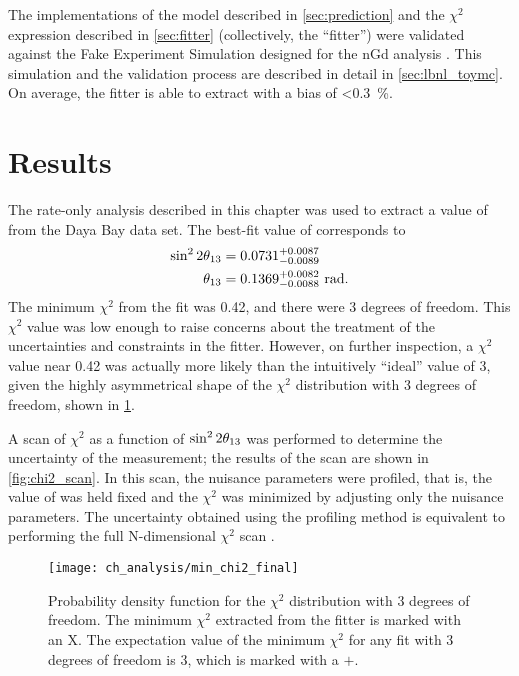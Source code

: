 The implementations of the model described in \cref{sec:prediction}
and the $\chi^2$ expression described in \cref{sec:fitter}
(collectively, the ``fitter'')
were validated against the Fake Experiment Simulation
designed for the nGd analysis \cite{lbnl_toymc}.
This simulation and the validation process are described in detail in \cref{sec:lbnl_toymc}.
On average, the fitter is able to extract \thetaot{}
with a bias of \SI{<0.3}{\percent}.

\section{Results}
\label{sec:results}

The rate-only analysis described in this chapter
was used to extract a value of \thetaot{}
from the Daya Bay data set.
The best-fit value of \thetaot{} corresponds to
\begin{align}\label{eq:result}
    \begin{split}
        \sin^22\theta_{13} &= 0.0731^{+0.0087}_{-0.0089}\\
        \theta_{13} &= 0.1369^{+0.0082}_{-0.0088}\ \si{\radian}.
    \end{split}
\end{align}
The minimum $\chi^2$ from the fit was 0.42, and there were 3 degrees of freedom.
This $\chi^2$ value was low enough to raise concerns
about the treatment of the uncertainties and constraints in the fitter.
However, on further inspection, a $\chi^2$ value near 0.42
was actually more likely than the intuitively ``ideal'' value of 3,
given the highly asymmetrical shape
of the $\chi^2$ distribution with 3 degrees of freedom,
shown in \cref{fig:chi2_pdf}.

A scan of $\chi^2$ as a function of $\sin^22\theta_{13}$
was performed to determine the uncertainty of the measurement;
the results of the scan are shown in \cref{fig:chi2_scan}.
In this scan, the nuisance parameters were profiled,
that is, the value of \thetaot{} was held fixed
and the $\chi^2$ was minimized by adjusting only the nuisance parameters.
The uncertainty obtained using the profiling method
is equivalent to performing the full N-dimensional $\chi^2$ scan \cite{pdg}.

\begin{figure}
    \centering
    \texttt{[image: ch\_analysis/min\_chi2\_final]}
    \caption[Minimum $\chi^2$ comparison]{
        Probability density function for the $\chi^2$ distribution
        with 3 degrees of freedom.
        The minimum $\chi^2$ extracted from the fitter
        is marked with an X.
        The expectation value of the minimum $\chi^2$
        for any fit with 3 degrees of freedom is 3,
        which is marked with a $+$.
    }
    \label{fig:chi2_pdf}
\end{figure}

